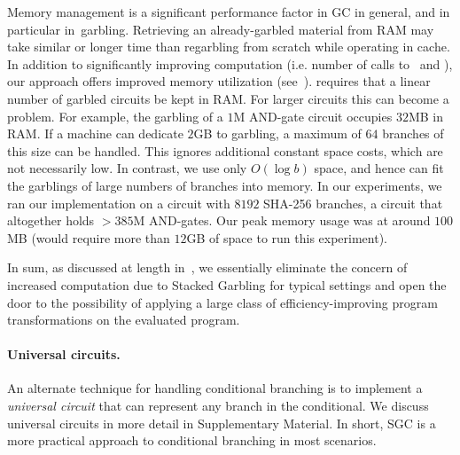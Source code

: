 Memory management is a significant performance factor in GC
in general, and in particular in~\HK garbling.  Retrieving an
already-garbled material from RAM may take similar or longer time than
regarbling from scratch while operating in cache.
In addition to significantly improving computation (i.e. number
of calls to \Gb\ and \Ev), our approach offers improved
memory utilization (see~).
\HK requires that a linear number of
garbled circuits be kept in RAM.  For larger circuits this can become
a problem.
For example, the garbling of a $1$M AND-gate circuit
occupies $32$MB in RAM.
If a machine can dedicate $2$GB to garbling, a maximum of
$64$ branches of this size can be handled. This
ignores additional constant space costs, which are not necessarily
low.
%
In contrast, we use only $O(\log b)$ space, and hence can
fit the garblings of large numbers of branches into memory.
In our experiments, we ran our implementation on a circuit with $8192$
SHA-256 branches, a circuit that altogether holds $> 385$M AND-gates.
Our peak memory usage was at around $100$MB (\HK would require more
than $12$GB of space to run this experiment).



In sum, as discussed at length
in~, we
essentially eliminate the concern of increased computation due to
Stacked Garbling for typical settings 
and open the door to the possibility of applying a large class of
efficiency-improving program transformations on the evaluated program.


\paragraph{Universal circuits.}
An alternate technique for handling conditional branching is to
implement a \emph{universal circuit} that can represent any branch in
the conditional.
We discuss universal circuits in more detail in Supplementary Material.
In short, SGC is a more practical approach to conditional branching in
most scenarios.

